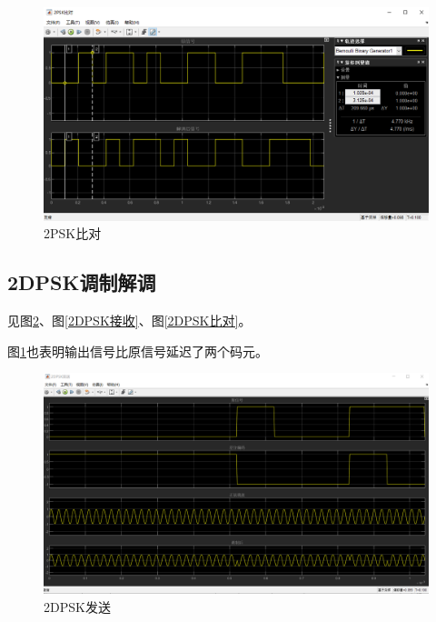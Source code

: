 \documentclass[11pt]{paper}
\begin{document}
\begin{figure}[H]
    \centering
    \includegraphics[width=5.9in]{texture/result/2psk比对.png}
    \caption{2PSK比对}
    \label{2PSK比对}
\end{figure}

\subsection{2DPSK调制解调}

见图\ref{2DPSK发送}、图\ref{2DPSK接收}、图\ref{2DPSK比对}。

图\ref{2PSK比对}也表明输出信号比原信号延迟了两个码元。

\begin{figure}[H]
    \centering
    \includegraphics[width=5.9in]{texture/result/2dpsk发送结果.png}
    \caption{2DPSK发送}
    \label{2DPSK发送}
\end{figure}
\end{document}
